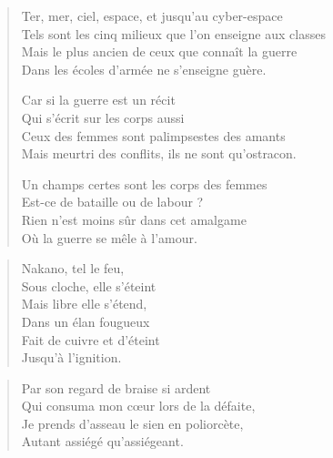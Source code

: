 \begin{verse}
Ter, mer, ciel, espace, et jusqu’au cyber-espace\\
Tels sont les cinq milieux que l’on enseigne aux classes\\
Mais le plus ancien de ceux que connaît la guerre\\
Dans les écoles d’armée ne s’enseigne guère.

Car si la guerre est un récit\\
Qui s’écrit sur les corps aussi\\
Ceux des femmes sont palimpsestes des amants\\
Mais meurtri des conflits, ils ne sont qu’ostracon.

Un champs certes sont les corps des femmes\\
Est-ce de bataille ou de labour ?\\
Rien n’est moins sûr dans cet amalgame\\
Où la guerre se mêle à l’amour.
\end{verse}



\begin{verse}
Nakano, tel le feu,\\
Sous cloche, elle s’éteint\\
Mais libre elle s’étend,\\
Dans un élan fougueux\\
Fait de cuivre et d’éteint\\
Jusqu’à l’ignition.
\end{verse}

\begin{verse}
Par son regard de braise si ardent\\
Qui consuma mon cœur lors de la défaite,\\
Je prends d’asseau le sien en poliorcète,\\
Autant assiégé qu’assiégeant.
\end{verse}

